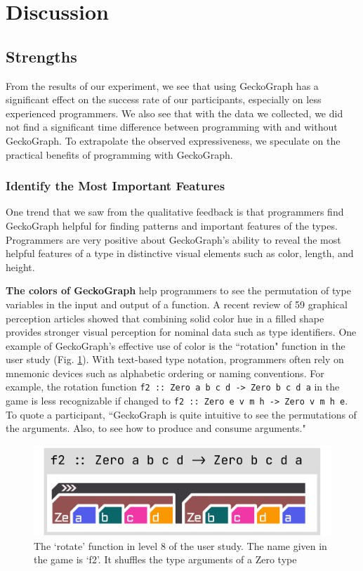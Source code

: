 \section{Discussion} \label{sec:gecko-discussion}
\subsection{Strengths}
From the results of our experiment, we see that using GeckoGraph has a significant effect on the success rate of our participants, especially on less experienced programmers. We also see that with the data we collected, we did not find a significant time difference between programming with and without GeckoGraph. To extrapolate the observed expressiveness, we speculate on the practical benefits of programming with GeckoGraph.

\subsubsection{Identify the Most Important Features}
One trend that we saw from the qualitative feedback is that programmers find GeckoGraph helpful for finding patterns and important features of the types. Programmers are very positive about GeckoGraph's ability to reveal the most helpful features of a type in distinctive visual elements such as color, length, and height.

\textbf{The colors of GeckoGraph} help programmers to see the permutation of type variables in the input and output of a function. A recent review \cite{Zeng2023-jz} of 59 graphical perception articles showed that combining solid color hue in a filled shape provides stronger visual perception for nominal data such as type identifiers. One example of GeckoGraph's effective use of color is the ``rotation" function in the user study (Fig. \ref{fig:rotate}). With text-based type notation, programmers often rely on mnemonic devices such as alphabetic ordering or naming conventions. For example, the rotation function \texttt{f2 :: Zero a b c d -> Zero b c d a} in the game is less recognizable if changed to \texttt{f2 :: Zero e v m h -> Zero v m h e}. To quote a participant, ``GeckoGraph is quite intuitive to see the permutations of the arguments. Also, to see how to produce and consume arguments." 

\begin{figure}[hbt]
  \includegraphics[width=0.6\linewidth]{figures/rotate}
  \caption[The `rotate' function in level 8 of the user study depicted in GeckoGraph]{\label{fig:rotate} The `rotate' function in level 8 of the user study. The name given in the game is `f2'. It shuffles the type arguments of a Zero type}
\end{figure}


